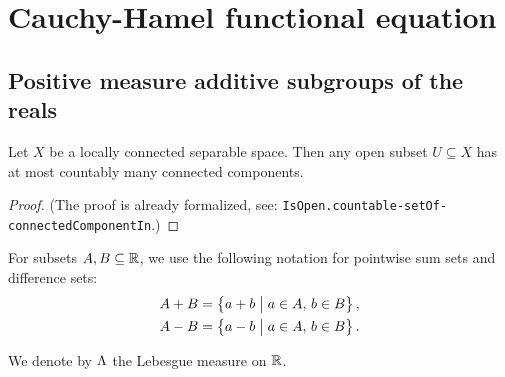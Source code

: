 \chapter{Cauchy-Hamel functional equation}

\section{Positive measure additive subgroups of the reals}

\begin{lemma}
  \label{lem:countably-many-connected-components-of-open}
  \leanok
  Let $X$ be a locally connected separable space. Then any open subset $U \subseteq X$ has at
  most countably many connected components.
\end{lemma}
\begin{proof}
  \leanok
  (The proof is already formalized, see:
  \texttt{IsOpen.countable-setOf-connectedComponentIn}.)
\end{proof}

For subsets $A, B \subseteq \mathbb{R}$, we use the following notation for pointwise
sum sets and difference sets:
\begin{align*}
  A + B & = \left\{  a + b \; \big| \; a \in A, \, b \in B  \right\} , \\
  A - B & = \left\{  a - b \; \big| \; a \in A, \, b \in B  \right\} .
\end{align*}

We denote by $\Lambda$ the Lebesgue measure on $\mathbb{R}$.

